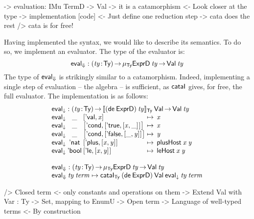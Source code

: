 \begin{wstructure}
    -> evaluation: IMu TermD -> Val
        -> it is a catamorphism
            <- Look closer at the type
        -> implementation [code]
            <- Just define one reduction step
            -> cata does the rest
                /> cata is for free!
\end{wstructure}

\newcommand{\evalH}{\F{eval}_{\green{\Downarrow}}}
\newcommand{\evalOne}{\F{eval}_{\green{\downarrow}}}

Having implemented the syntax, we would like to describe its
semantics. To do so, we implement an evaluator. The type of the
evaluator is:
%
\[
\evalH : \PI{\V{ty}}{\Ty} 
         \IMu{\Ty}{\HExprD}{\V{ty}} \To
         \Val{\V{ty}}
\]
%
The type of $\evalH$ is strikingly similar to a
catamorphism. Indeed, implementing a single step of evaluation -- the
algebra -- is sufficient, as $\cataI$ gives, for free, the full
evaluator. The implementation is as follows:
%
\[\stk{
\evalOne : \PI{\V{ty}}{\Ty} \idescop{(\toIDesc{\HExprD})\:\V{ty}}{\Ty}{\SYMBVal}
           \To {\Val{\V{ty}}} \\
\begin{array}{@{}l@{}c@{}l@{\:\mapsto\:\:}l}
\evalOne\: & \_\: & \pair{\SYMBEval}{\V{x}}{}                                             & \V{x} \\
\evalOne\: & \_\: & \pair{\SYMBEcond}{\pair{\BoolTrue}{\pair{\V{x}}{\_}{}}{}}{}   & \V{x} \\
\evalOne\: & \_\: & \pair{\SYMBEcond}{\pair{\BoolFalse}{\pair{\_}{\V{y}}{}}{}}{}  & \V{y} \\
\evalOne\: & \Enat\: & \pair{\SYMBEplus}{\pair{\V{x}}{\V{y}}{}}{}                     & \F{plusHost}\: \V{x}\: \V{y} \\
\evalOne\: & \Ebool\: & \pair{\SYMBEle}{\pair{\V{x}}{\V{y}}{}}{}                      & \F{leHost}\: \V{x}\: \V{y} 
\end{array} \\
\\
\evalH : \PI{\V{ty}}{\Ty} 
           \IMu{\Ty}{\HExprD}{\V{ty}} \To
           \Val{\V{ty}} \\
\evalH\: \V{ty}\: \V{term} \mapsto \cataI_{\Ty} \:
                                 (\toIDesc{\HExprD})\: 
                                 \SYMBVal\: 
                                 \evalOne\: 
                                 \V{ty}\: 
                                 \V{term}
}\]

\begin{wstructure}
    /> Closed term
        <- only constants and operations on them
        -> Extend Val with Var : Ty -> Set, mapping to EnumU
            -> Open term
            -> Language of well-typed terms
                <- By construction
\end{wstructure}

